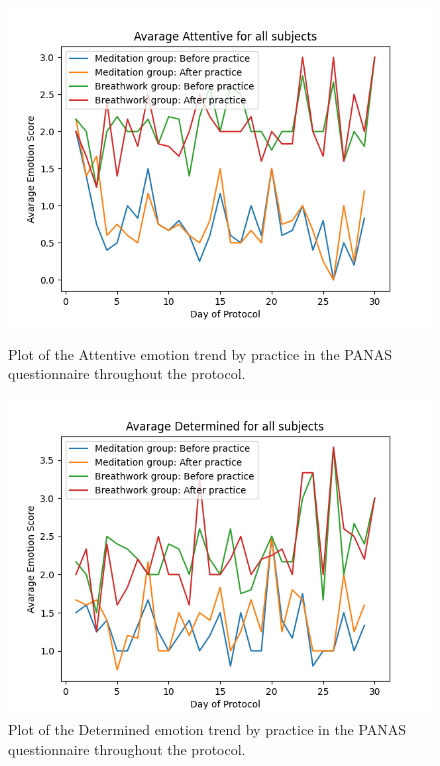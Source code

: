 \begin{figure}
    \centering
    \begin{minipage}{0.49\linewidth}
        \includegraphics[width=\linewidth]{Figures/panas/emotions/Attentive.png}
        \caption{Plot of the Attentive emotion trend by practice in the PANAS questionnaire throughout the protocol.}
        \label{fig:attentive_by_practice}
    \end{minipage}
    \hfill %
    \begin{minipage}{0.49\linewidth}
        \includegraphics[width=\linewidth]{Figures/panas/emotions/Determined.png}
        \caption{Plot of the Determined emotion trend by practice in the PANAS questionnaire throughout the protocol.}
        \label{fig:Determined_by_practice}
    \end{minipage}
\end{figure} %

